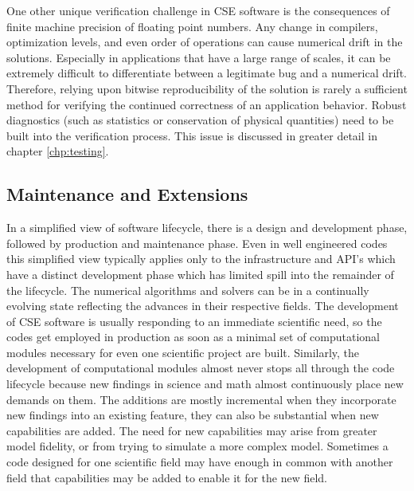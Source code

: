 One other unique verification challenge in CSE software is the
consequences of finite machine precision of floating point
numbers. Any change in compilers, optimization levels, and even order
of operations can cause numerical drift in the solutions. Especially
in applications that have a large range of scales, it can be extremely
difficult to differentiate between a legitimate bug and a numerical
drift. Therefore, relying upon bitwise reproducibility of the solution is
rarely a sufficient method for verifying the continued correctness of
an application behavior. Robust diagnostics (such as statistics or
conservation of physical quantities) need to be built into the
verification process.  This issue is
discussed in greater detail in chapter \ref{chp:testing}.

\subsection{Maintenance and Extensions}
\label{sec:maintain}
In a simplified view of software lifecycle, there is a design and development phase,
followed by production and maintenance phase. 
   Even in well engineered
codes this simplified view typically applies only to the
infrastructure and API's which have a distinct development phase which
has limited spill into the remainder of the lifecycle. The numerical
algorithms and solvers can be in a continually evolving state
reflecting the advances in their respective fields.  
The development of CSE software is
usually responding to an immediate scientific need, so the codes get
employed in production as soon as a minimal set of computational
modules necessary for even one scientific project are
built. Similarly, the development of computational modules almost
never stops all through the code lifecycle because new findings in science
and math almost continuously place new demands on them. The additions
are mostly incremental when they incorporate new findings into an
existing feature, they can also be substantial when new capabilities
are added. The need for new capabilities may arise from 
greater model fidelity, or from trying to simulate a more complex
model. Sometimes a code designed for one scientific field may have
enough in common with another field that capabilities may be added to
enable it for the new field.   

